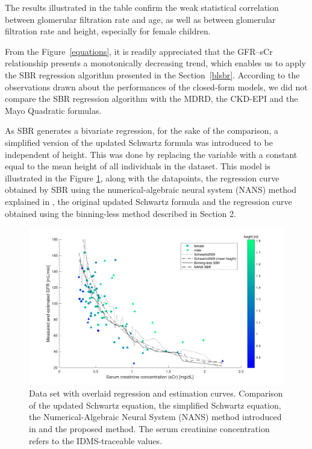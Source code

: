\documentclass[10pt,final]{siamltex}
\begin{document}
%
The results illustrated in the table confirm the weak statistical correlation between glomerular filtration rate and age, as well as between glomerular filtration rate and height, especially for female children.

From the Figure~\ref{equations}, it is readily appreciated that the GFR--sCr relationship presents a monotonically decreasing trend, which enables us to apply the SBR regression algorithm presented in the Section~\ref{blsbr}. According to the observations drawn about the performances of the closed-form models, we did not compare the SBR regression algorithm with the MDRD, the CKD-EPI and the Mayo Quadratic formulas.

As SBR generates a bivariate regression, for the sake of the comparison, a simplified version of the updated Schwartz formula was introduced to be independent of height. This was done by replacing the variable with a constant equal to the mean height of all individuals in the dataset. This model is illustrated in the Figure \ref{regression}, along with the datapoints, the regression curve obtained by SBR using the numerical-algebraic neural system (NANS) method explained in \cite{fiori}, the original updated Schwartz formula and the regression curve obtained using the binning-less method described in Section 2.
%
\begin{figure}[ht]
  \centering
  \includegraphics[scale=0.6]{figures/regression}
  \caption{Data set with overlaid regression and estimation curves. Comparison of the updated Schwartz equation, the simplified Schwartz equation, the Numerical-Algebraic Neural System (NANS) method introduced in \cite{fiori} and the proposed method. The serum creatinine concentration refers to the IDMS-traceable values.}
  \label{regression}
\end{figure}
\end{document}
